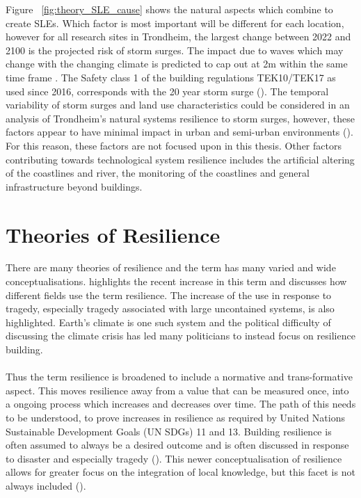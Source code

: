 Figure ~\ref{fig:theory_SLE_cause} shows the natural aspects which combine to create SLEs. Which factor is most important will be different for each location, however for all research sites in Trondheim, the largest change between 2022 and 2100 is the projected risk of storm surges. The impact due to waves which may change with the changing climate is predicted to cap out at 2m within the same time frame \cite{hanssen_saksframlegg_2013}. The Safety class 1 of the building regulations TEK10/TEK17 as used since 2016, corresponds with the 20 year storm surge (\cite{tides_high_2022}). The temporal variability of storm surges and land use characteristics could be considered in an analysis of Trondheim's natural systems resilience to storm surges, however, these factors appear to have minimal impact in urban and semi-urban environments (\cite{hoffken_effects_2020}). For this reason, these factors are not focused upon in this thesis. Other factors contributing towards technological system resilience includes the artificial altering of the coastlines and river, the monitoring of the coastlines and general infrastructure beyond buildings.

\section{Theories of Resilience }

There are many theories of resilience and the term has many varied and wide conceptualisations. \cite{moser_turbulent_2019} highlights the recent increase in this term and discusses how different fields use the term resilience.  The increase of the use in response to tragedy, especially tragedy associated with large uncontained systems, is also highlighted. Earth's climate is one such system and the political difficulty of discussing the climate crisis has led many politicians to instead focus on resilience building. 
\paragraph{}

Thus the term resilience is broadened to include a normative and trans-formative aspect.  This moves resilience away from a value that can be measured once, into a ongoing process which increases and decreases over time. The path of this needs to be understood, to prove increases in resilience as required by United Nations Sustainable Development Goals (UN SDGs) 11 and 13. Building resilience is often assumed to always be a desired outcome and is often discussed in response to disaster and especially tragedy (\cite{moser_turbulent_2019}). This newer conceptualisation of resilience allows for greater focus on the integration of local knowledge, but this facet is not always included (\cite{moser_turbulent_2019}).
